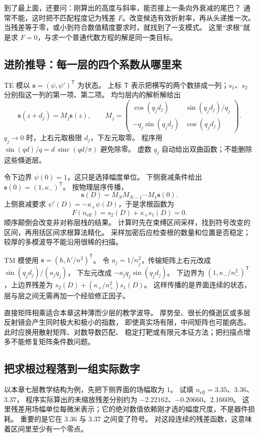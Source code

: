 到了最上面，还要问：刚算出的高度与斜率，能否接上一条向外衰减的尾巴？
通常不能，这时把不匹配程度记为残差 $F$。改变候选有效折射率，再从头递推一次。
当残差等于零，或小到符合数值精度要求时，就找到了一支模式。
这里“求根”就是求 $F=0$，与求一个普通代数方程的解是同一类目标。

\subsection{进阶推导：每一层的四个系数从哪里来}
TE 模以 $\mathbf s=(\psi,\psi')^{\mathsf T}$ 为状态。
上标 $\mathsf T$ 表示把横写的两个数排成一列；$s_1$、$s_2$ 分别指这一列的第一项、第二项。
均匀层内的解析解给出
\begin{equation}
\mathbf s(z+d_j)=M_j\mathbf s(z),\qquad
M_j=
\begin{pmatrix}
\cos(q_jd_j)&\sin(q_jd_j)/q_j\\
-q_j\sin(q_jd_j)&\cos(q_jd_j)
\end{pmatrix}.
\label{eq:vertical_matrix}
\end{equation}
$q_j\to0$ 时，上右元取极限 $d_j$，下左元取零。
程序用 $\sin(qd)/q=d\,\operatorname{sinc}(qd/\pi)$ 避免除零。
虚数 $q_j$ 自动给出双曲函数；不能删除这些倏逝层。

令下边界 $\psi(0)=1$，这只是选择幅度单位。
下侧衰减条件给出 $\mathbf s(0)=(1,\kappa_-)^{\mathsf T}$。
按物理层序传播，
\[
\mathbf s(D)=M_N M_{N-1}\cdots M_1\mathbf s(0).
\]
上侧衰减要求 $\psi'(D)=-\kappa_+\psi(D)$，于是求根函数为
\begin{equation}
F(n_{\mathrm{eff}})=s_2(D)+\kappa_+s_1(D)=0.
\label{eq:vertical_residual}
\end{equation}
顺序颠倒会改变非对称层栈的结果。
计算时先在束缚区间采样，找到符号改变的区间，再用括区间求根算法精化。
采样加密后应检查根的数量和位置是否稳定；较厚的多模波导不能沿用很稀的扫描。

TM 模使用 $\mathbf s=(h,h'/n^2)^{\mathsf T}$。
令 $a_j=1/n_j^2$，传输矩阵上右元改成 $\sin(q_jd_j)/(a_jq_j)$，
下左元改成 $-a_jq_j\sin(q_jd_j)$。
下边界为 $(1,\kappa_-/n_-^2)^{\mathsf T}$，上边界残差为
$s_2(D)+(\kappa_+/n_+^2)s_1(D)$。
这样传播的是界面连续的状态，层与层之间无需再加一个经验修正因子。

直接矩阵相乘适合本章这种薄而少层的教学波导。
厚势垒、很长的倏逝区或多层反射镜会产生同时极大和极小的指数，
即使真实场有限，中间矩阵也可能病态。此时应换用散射矩阵、对数导数匹配、
稳定打靶或有限元本征方法；把扫描点增多不能修复矩阵条件数问题。

\subsection{把求根过程落到一组实际数字}
以本章七层教学结构为例，先把下侧界面的场幅取为 1。
试填 $n_{\mathrm{eff}}=3.35$、$3.36$、$3.37$，
程序实际算出的未缩放残差分别约为 $-2.22162$、$-0.20660$、$2.16609$。
这里残差用场幅单位每微米表示；它的绝对数值依赖刚才选的幅度尺度，不是器件损耗。
重要的是它在 $3.36$ 与 $3.37$ 之间变了符号。
对这段连续的残差函数，这意味着区间里至少有一个零点。

